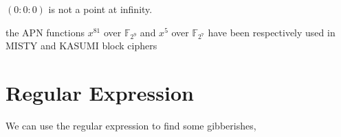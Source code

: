 \documentclass[8pt,oneside]{article}
\newcommand{\0}{\textbf{0}}
\newcommand{\1}{\textbf{1}}
\newcommand{\F}{\mathbb{F}}
\begin{document}
    $ (0:0:0) $ is not a point at infinity. 
    

    the APN functions $x^{81}$ over $\F_{2^9}$ and $x^5$ over $\F_{2^7}$ have been respectively used in MISTY and KASUMI block ciphers

\section{Regular Expression}
    We can use the regular expression to find some gibberishes, 



\end{document}
